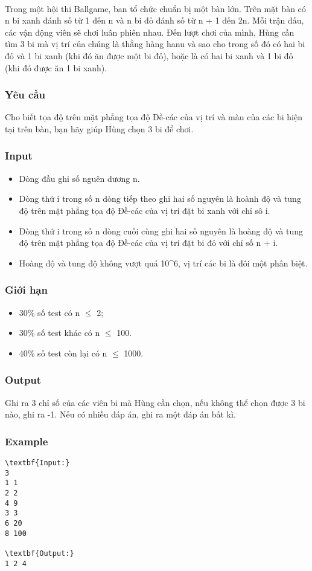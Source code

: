 

 

Trong một hội thi Ballgame, ban tổ chức chuẩn bị một bàn lớn. Trên mặt bàn có n bi xanh đánh số từ 1 đến n và n bi đỏ đánh số từ n + 1 đến 2n. Mỗi trận đấu, các vận động viên sẽ chơi luân phiên nhau. Đến lượt chơi của mình, Hùng cần tìm 3 bi mà vị trí của chúng là thằng hàng hanu và sao cho trong số đó có hai bi đỏ và 1 bi xanh (khi đó ăn được một bi đỏ), hoặc là có hai bi xanh và 1 bi đỏ (khi đó được ăn 1 bi xanh).

\subsubsection{Yêu cầu}

Cho biết tọa độ trên mặt phẳng tọa độ Đề-các của vị trí và màu của các bi hiện tại trên bàn, bạn hãy giúp Hùng chọn 3 bi để chơi.

\subsubsection{Input}
\begin{itemize}
	\item Dòng đầu ghi số nguên dương n.
	\item Dòng thứ i trong số n dòng tiếp theo ghi hai số nguyên là hoành độ và tung độ trên mặt phẳng tọa độ Đề-các của vị trí đặt bi xanh với chỉ sô i.
	\item Dòng thứ i trong số n dòng cuối cùng ghi hai số nguyên là hoàng độ và tung độ trên mặt phẳng tọa độ Đề-các của vị trí đặt bi đỏ với chỉ số n + i.
	\item Hoàng độ và tung độ không vượt quá 10\textasciicircum6, vị trí các bi là đôi một phân biệt.
\end{itemize}

\subsubsection{Giới hạn}
\begin{itemize}
	\item 30\% số test có n  $\le$  2;
	\item 30\% số test khác có n  $\le$  100.
	\item 40\% số test còn lại có n  $\le$  1000.
\end{itemize}

\subsubsection{Output}

Ghi ra 3 chỉ số của các viên bi mà Hùng cần chọn, nếu không thể chọn được 3 bi nào, ghi ra -1. Nếu có nhiều đáp án, ghi ra một đáp án bất kì.

\subsubsection{Example}
\begin{verbatim}
\textbf{Input:}
3
1 1
2 2
4 9
3 3
6 20
8 100

\textbf{Output:}
1 2 4
\end{verbatim}
